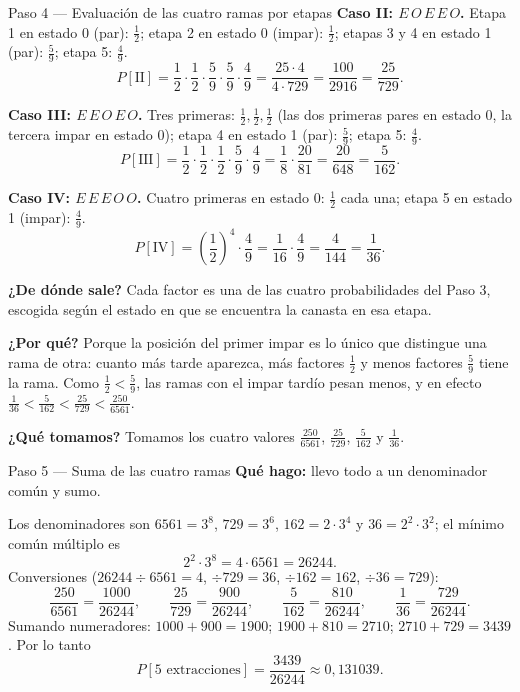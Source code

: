 \documentclass[11pt]{article}
\begin{document}
\begin{sol}
\begin{paso}{Paso 4 --- Evaluaci\'on de las cuatro ramas por etapas}
\textbf{Caso II: $E\,O\,E\,E\,O$.} Etapa 1 en estado 0 (par): $\frac{1}{2}$; etapa 2 en estado 0 (impar): $\frac{1}{2}$; etapas 3 y 4 en estado 1 (par): $\frac{5}{9}$; etapa 5: $\frac{4}{9}$.
\[
P[\text{II}]=\frac{1}{2}\cdot\frac{1}{2}\cdot\frac{5}{9}\cdot\frac{5}{9}\cdot\frac{4}{9}
=\frac{25\cdot 4}{4\cdot 729}=\frac{100}{2916}=\frac{25}{729}.
\]

\textbf{Caso III: $E\,E\,O\,E\,O$.} Tres primeras: $\frac{1}{2},\frac{1}{2},\frac{1}{2}$ (las dos primeras pares en estado 0, la tercera impar en estado 0); etapa 4 en estado 1 (par): $\frac{5}{9}$; etapa 5: $\frac{4}{9}$.
\[
P[\text{III}]=\frac{1}{2}\cdot\frac{1}{2}\cdot\frac{1}{2}\cdot\frac{5}{9}\cdot\frac{4}{9}
=\frac{1}{8}\cdot\frac{20}{81}=\frac{20}{648}=\frac{5}{162}.
\]

\textbf{Caso IV: $E\,E\,E\,O\,O$.} Cuatro primeras en estado 0: $\frac{1}{2}$ cada una; etapa 5 en estado 1 (impar): $\frac{4}{9}$.
\[
P[\text{IV}]=\left(\frac{1}{2}\right)^{4}\cdot\frac{4}{9}=\frac{1}{16}\cdot\frac{4}{9}=\frac{4}{144}=\frac{1}{36}.
\]

\textbf{¿De d\'onde sale?} Cada factor es una de las cuatro probabilidades del Paso 3, escogida seg\'un el estado en que se encuentra la canasta en esa etapa.

\textbf{¿Por qu\'e?} Porque la posici\'on del primer impar es lo \'unico que distingue una rama de otra: cuanto m\'as tarde aparezca, m\'as factores $\frac{1}{2}$ y menos factores $\frac{5}{9}$ tiene la rama. Como $\frac{1}{2}<\frac{5}{9}$, las ramas con el impar tard\'io pesan menos, y en efecto $\frac{1}{36}<\frac{5}{162}<\frac{25}{729}<\frac{250}{6561}$.

\textbf{¿Qu\'e tomamos?} Tomamos los cuatro valores $\frac{250}{6561}$, $\frac{25}{729}$, $\frac{5}{162}$ y $\frac{1}{36}$.
\end{paso}

\begin{paso}{Paso 5 --- Suma de las cuatro ramas}
\textbf{Qu\'e hago:} llevo todo a un denominador com\'un y sumo.

Los denominadores son $6561=3^{8}$, $729=3^{6}$, $162=2\cdot 3^{4}$ y $36=2^{2}\cdot 3^{2}$; el m\'inimo com\'un m\'ultiplo es
\[
2^{2}\cdot 3^{8}=4\cdot 6561=26244 .
\]
Conversiones ($26244\div 6561=4$, $\div 729=36$, $\div 162=162$, $\div 36=729$):
\[
\frac{250}{6561}=\frac{1000}{26244},
\qquad
\frac{25}{729}=\frac{900}{26244},
\qquad
\frac{5}{162}=\frac{810}{26244},
\qquad
\frac{1}{36}=\frac{729}{26244}.
\]
Sumando numeradores: $1000+900=1900$; $1900+810=2710$; $2710+729=3439$. Por lo tanto
\[
P[\text{5 extracciones}]=\frac{3439}{26244}\approx 0{,}131039 .
\]


\end{paso}
\end{sol}
\end{document}
